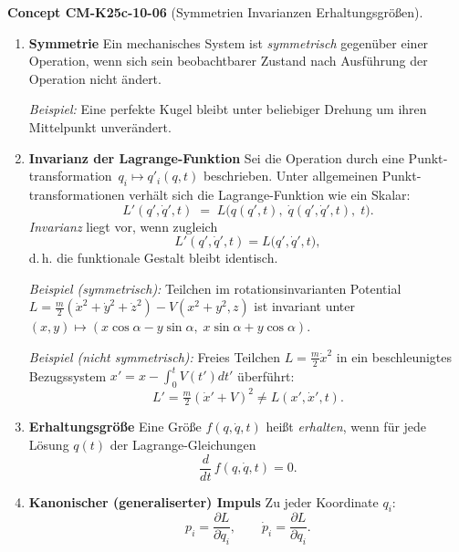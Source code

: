 \documentclass[10pt, letterpaper]{article}
\newcommand{\CustomHeading}[3]{%
  \par\medskip\noindent%
  \textbf{#1 #2} \textnormal{(#3)}.\enskip%
}
\newenvironment{CONC}[2]{\begin{unitbox}\CustomHeading{Concept}{#1}{#2}}{\end{unitbox}}
\begin{document}



\begin{CONC}{CM-K25c-10-06}{Symmetrien Invarianzen Erhaltungsgrößen}
\begin{enumerate}

\item \textbf{Symmetrie}  
Ein mechanisches System ist \emph{symmetrisch} gegenüber einer
Operation, wenn sich sein beobachtbarer Zustand nach Ausführung der
Operation nicht ändert.

\textit{Beispiel:} Eine perfekte Kugel bleibt unter beliebiger
Drehung um ihren Mittelpunkt unverändert.

\item \textbf{Invarianz der Lagrange-Funktion}  
Sei die Operation durch eine Punkt­transformation
$\,q_i\mapsto q'_i(q,t)$ beschrieben.
Unter allgemeinen Punkt­transformationen verhält sich die
Lagrange-Funktion wie ein Skalar:
\[
  L'(q',\dot q',t)
  \;=\;
  L\!\bigl(q(q',t),\;\dot q(q',\dot q',t),\;t\bigr).
\]
\emph{Invarianz} liegt vor, wenn zugleich
\[
  L'(q',\dot q',t)
  =L\!\bigl(q'\!,\dot q',t\bigr),
\]
d.\,h. die funktionale Gestalt bleibt identisch.

\textit{Beispiel (symmetrisch):} Teilchen im rotations­invarianten
Potential  
$L=\tfrac{m}{2}(\dot x^2+\dot y^2+\dot z^2)-V(x^2+y^2,z)$  
ist invariant unter
$(x,y)\mapsto(x\cos\alpha-y\sin\alpha,\;x\sin\alpha+y\cos\alpha)$.

\textit{Beispiel (nicht symmetrisch):}  
Freies Teilchen  
$L=\tfrac{m}{2}\dot x^{2}$
in ein beschleunigtes Bezugs­system  
$x'=x-\!\int_0^t\!V(t')dt'$ überführt:
\[
  L'=\tfrac{m}{2}(\dot x'+V)^{2}\neq L(x'\!,\dot x',t).
\]

\item \textbf{Erhaltungsgröße}  
Eine Größe
$f(q,\dot q,t)$ heißt \emph{erhalten}, wenn für jede Lösung
$q(t)$ der Lagrange-Gleichungen
\[
  \frac{d}{dt}\,f(q,\dot q,t)=0.
\]

\item \textbf{Kanonischer (generaliserter) Impuls}  
Zu jeder Koordinate $q_i$:
\[
  p_i=\frac{\partial L}{\partial\dot q_i},
  \qquad
  \dot p_i=\frac{\partial L}{\partial q_i}.
\]


\end{enumerate}
\end{CONC}
\end{document}
